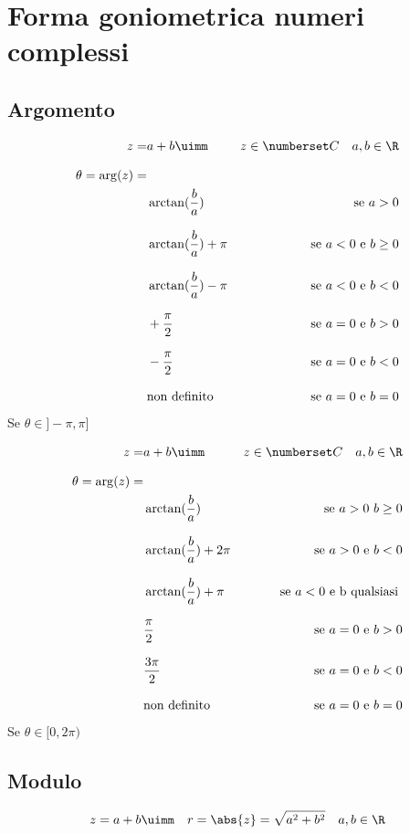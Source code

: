 \chapter{Forma goniometrica numeri complessi}
\section{Argomento}
\begin{align*}
z=&a+b\uimm& z\in\Co\quad a,b\in\R\\[8pt]
\theta=\arg(z)=&\\
&\arctan(\dfrac{b}{a})&\text{se}\ a>0 \\[8pt]
&\arctan(\dfrac{b}{a})+\pi&\text{se}\ a<0 \ \text{e} \ b\geq0\\[8pt]
&\arctan(\dfrac{b}{a})-\pi&\text{se}\ a<0\ \text{e} \ b<0\\[8pt]
&+\dfrac{\pi}{2}&\text{se}\ a=0 \ \text{e} \ b>0\\[8pt]
&-\dfrac{\pi}{2}&\text{se}\ a=0 \ \text{e} \ b<0\\[8pt]
&\text{non definito}&\text{se}\ a=0 \ \text{e} \ b=0
\end{align*}
Se $\theta\in]-\pi,\pi]$

\begin{align*}
z=&a+b\uimm& z\in\Co\quad a,b\in\R\\[8pt]
\theta=\arg(z)=&\\
&\arctan(\dfrac{b}{a})&\text{se}\ a>0\ b\geq 0 \\[8pt]
&\arctan(\dfrac{b}{a})+2\pi&\text{se}\ a>0 \ \text{e} \ b<0\\[8pt]
&\arctan(\dfrac{b}{a})+\pi&\text{se}\ a<0\ \text{e b qualsiasi} \ \\[8pt]
&\dfrac{\pi}{2}&\text{se}\ a=0 \ \text{e} \ b>0\\[8pt]
&\dfrac{3\pi}{2}&\text{se}\ a=0 \ \text{e} \ b<0\\[8pt]
&\text{non definito}&\text{se}\ a=0 \ \text{e} \ b=0
\end{align*}
Se $\theta\in[0,2\pi)$
 \section{Modulo}
\begin{equation}
z=a+b\uimm\quad r=\abs{z}=\sqrt{a^2+b^2}\quad a,b\in\R
\end{equation}
